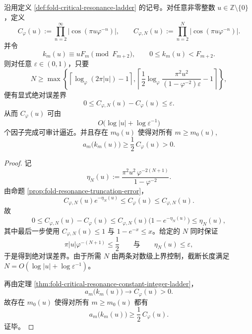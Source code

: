 \begin{theorem}[整数共振梯常数的对数复杂度可认证性与最终持久性]\label{thm:xi-fold-resonance-ladder-logarithmic-auditability}
沿用定义 \ref{def:fold-critical-resonance-ladder} 的记号。对任意非零整数 \(u\in\mathbb Z\setminus\{0\}\)，定义
\[
C_\varphi(u):=\prod_{n=2}^{\infty}\bigl|\cos(\pi u\varphi^{-n})\bigr|,
\qquad
C_{\varphi,N}(u):=\prod_{n=2}^{N}\bigl|\cos(\pi u\varphi^{-n})\bigr|.
\]
并令
\[
k_m(u)\equiv uF_m\pmod{F_{m+2}},
\qquad 0\le k_m(u)<F_{m+2}.
\]
则对任意 \(\varepsilon\in(0,1)\)，只要
\[
N\ge
\max\!\left\{
\left\lceil \log_\varphi(2\pi |u|)-1\right\rceil,
\left\lceil \frac12\log_\varphi
\frac{\pi^2u^2}{(1-\varphi^{-2})\varepsilon}-1\right\rceil
\right\},
\]
便有显式绝对误差界
\[
\boxed{\;0\le C_{\varphi,N}(u)-C_\varphi(u)\le \varepsilon.\;}
\]
从而 \(C_\varphi(u)\) 可由
\[
O\bigl(\log |u|+\log \varepsilon^{-1}\bigr)
\]
个因子完成可审计逼近。并且存在 \(m_0(u)\) 使得对所有 \(m\ge m_0(u)\),
\[
a_m\!\bigl(k_m(u)\bigr)\ge \frac12\,C_\varphi(u)>0.
\]
\end{theorem}
\begin{proof}
记
\[
\eta_N(u):=
\frac{\pi^2u^2\,\varphi^{-2(N+1)}}{1-\varphi^{-2}}.
\]
由命题 \ref{prop:fold-resonance-truncation-error}，
\[
C_{\varphi,N}(u)e^{-\eta_N(u)}\le C_\varphi(u)\le C_{\varphi,N}(u).
\]
故
\[
0\le C_{\varphi,N}(u)-C_\varphi(u)
\le C_{\varphi,N}(u)\bigl(1-e^{-\eta_N(u)}\bigr)
\le \eta_N(u),
\]
其中最后一步使用 \(C_{\varphi,N}(u)\le 1\) 与 \(1-e^{-x}\le x\)。给定的 \(N\) 同时保证
\[
\pi |u|\varphi^{-(N+1)}\le \frac12
\qquad\text{与}\qquad
\eta_N(u)\le \varepsilon,
\]
于是得到绝对误差界。由于所需 \(N\) 由两条对数级上界控制，截断长度满足
\(
N=O(\log|u|+\log\varepsilon^{-1})
\)。
\par
再由定理 \ref{thm:fold-critical-resonance-constant-integer-ladder}，
\[
a_m\!\bigl(k_m(u)\bigr)\longrightarrow C_\varphi(u)>0.
\]
故存在 \(m_0(u)\) 使得对所有 \(m\ge m_0(u)\) 都有
\[
a_m\!\bigl(k_m(u)\bigr)\ge \frac12\,C_\varphi(u).
\]
证毕。
\end{proof}


